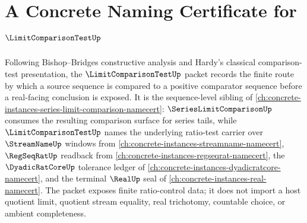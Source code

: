 \chapter{A Concrete Naming Certificate for $\LimitComparisonTestUp$}
\label{ch:concrete-instances-limit-comparison-test-namecert}

Following Bishop--Bridges constructive analysis and Hardy's classical comparison-test presentation, the $\LimitComparisonTestUp$ packet records the finite route by which a source sequence is compared to a positive comparator sequence before a real-facing conclusion is exposed. It is the sequence-level sibling of \autoref{ch:concrete-instances-series-limit-comparison-namecert}: $\SeriesLimitComparisonUp$ consumes the resulting comparison surface for series tails, while $\LimitComparisonTestUp$ names the underlying ratio-test carrier over $\StreamNameUp$ windows from \autoref{ch:concrete-instances-streamname-namecert}, $\RegSeqRatUp$ readback from \autoref{ch:concrete-instances-regseqrat-namecert}, the $\DyadicRatCoreUp$ tolerance ledger of \autoref{ch:concrete-instances-dyadicratcore-namecert}, and the terminal $\RealUp$ seal of \autoref{ch:concrete-instances-real-namecert}. The packet exposes finite ratio-control data; it does not import a host quotient limit, quotient stream equality, real trichotomy, countable choice, or ambient completeness.

